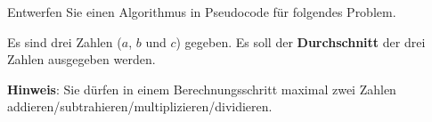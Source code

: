 %
%
Entwerfen Sie einen Algorithmus in Pseudocode für folgendes Problem.

\begin{problem}\label{problem-durchschnitt-3-zahlen}
Es sind drei Zahlen ($a$, $b$ und $c$) gegeben. Es soll der \textbf{Durchschnitt} der drei Zahlen ausgegeben werden.
\end{problem}

\textbf{Hinweis}: Sie dürfen in einem Berechnungsschritt maximal zwei Zahlen addieren/subtrahieren/multiplizieren/dividieren.

\fillwithgrid	{1.25in}
